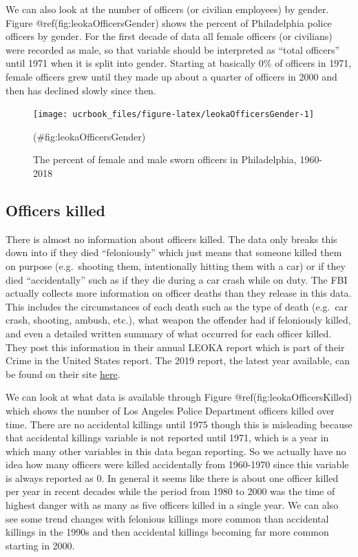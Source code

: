\documentclass[
  12pt,
  openany]{book}
\begin{document}
We can also look at the number of officers (or civilian employees) by gender. Figure @ref(fig:leokaOfficersGender) shows the percent of Philadelphia police officers by gender. For the first decade of data all female officers (or civilians) were recorded as male, so that variable should be interpreted as ``total officers'' until 1971 when it is split into gender. Starting at basically 0\% of officers in 1971, female officers grew until they made up about a quarter of officers in 2000 and then has declined slowly since then.

\begin{figure}

{\centering \texttt{[image: ucrbook\_files/figure-latex/leokaOfficersGender-1]} 

}

\caption{The percent of female and male sworn officers in Philadelphia, 1960-2018}(\#fig:leokaOfficersGender)
\end{figure}

\hypertarget{officers-killed}{%
\subsection{Officers killed}\label{officers-killed}}

There is almost no information about officers killed. The data only breaks this down into if they died ``feloniously'' which just means that someone killed them on purpose (e.g.~shooting them, intentionally hitting them with a car) or if they died ``accidentally'' such as if they die during a car crash while on duty. The FBI actually collects more information on officer deaths than they release in this data. This includes the circumstances of each death such as the type of death (e.g.~car crash, shooting, ambush, etc.), what weapon the offender had if feloniously killed, and even a detailed written summary of what occurred for each officer killed. They post this information in their annual LEOKA report which is part of their Crime in the United States report. The 2019 report, the latest year available, can be found on their site \href{https://ucr.fbi.gov/leoka/2019/home}{here}.

We can look at what data is available through Figure @ref(fig:leokaOfficersKilled) which shows the number of Los Angeles Police Department officers killed over time. There are no accidental killings until 1975 though this is misleading because that accidental killings variable is not reported until 1971, which is a year in which many other variables in this data began reporting. So we actually have no idea how many officers were killed accidentally from 1960-1970 since this variable is always reported as 0. In general it seems like there is about one officer killed per year in recent decades while the period from 1980 to 2000 was the time of highest danger with as many as five officers killed in a single year. We can also see some trend changes with felonious killings more common than accidental killings in the 1990s and then accidental killings becoming far more common starting in 2000.
\end{document}
